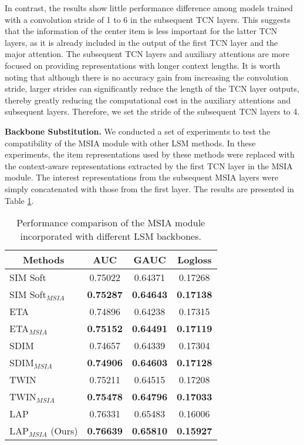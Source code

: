 In contrast, the results show little performance difference among models trained with a convolution stride of 1 to 6 in the subsequent TCN layers. This suggests that the information of the center item is less important for the latter TCN layers, as it is already included in the output of the first TCN layer and the major attention. The subsequent TCN layers and auxiliary attentions are more focused on providing representations with longer context lengths. It is worth noting that although there is no accuracy gain from increasing the convolution stride, larger strides can significantly reduce the length of the TCN layer outputs, thereby greatly reducing the computational cost in the auxiliary attentions and subsequent layers. Therefore, we set the stride of the subsequent TCN layers to 4. 

\textbf{Backbone Substitution.} We conducted a set of experiments to test the compatibility of the MSIA module with other LSM methods. In these experiments, the item representations used by these methods were replaced with the context-aware representations extracted by the first TCN layer in the MSIA module. The interest representations from the subsequent MSIA layers were simply concatenated with those from the first layer. The results are presented in Table \ref{tab:MSIA_LSMs}.
		
\begin{table}[t]
    \centering
    \caption{Performance comparison of the MSIA module incorporated with different LSM backbones.}
    \begin{tabular}{cccc}
    \toprule
     Methods & AUC & GAUC & Logloss \\
    \midrule
    \multicolumn{1}{l|}{SIM Soft} & 0.75022 & 0.64371 & 0.17268 \\
    \multicolumn{1}{l|}{SIM Soft$_{MSIA}$} & \textbf{0.75287} & \textbf{0.64643} & \textbf{0.17138} \\
    \midrule
    \multicolumn{1}{l|}{ETA} & 0.74896 & 0.64238 & 0.17315 \\
    \multicolumn{1}{l|}{ETA$_{MSIA}$} & \textbf{0.75152} & \textbf{0.64491} & \textbf{0.17119} \\
    \midrule
    \multicolumn{1}{l|}{SDIM} & 0.74657 & 0.64339 & 0.17304 \\
    \multicolumn{1}{l|}{SDIM$_{MSIA}$} & \textbf{0.74906} & \textbf{0.64603} & \textbf{0.17128} \\
    \midrule
    \multicolumn{1}{l|}{TWIN} & 0.75211	& 0.64515 & 0.17208 \\
    \multicolumn{1}{l|}{TWIN$_{MSIA}$} &  \textbf{0.75478} & \textbf{0.64796} & \textbf{0.17033} \\
    \midrule
    \multicolumn{1}{l|}{LAP} & 0.76331 & 0.65483 & 0.16006 \\
    \multicolumn{1}{l|}{LAP$_{MSIA}$ (Ours)} &  \textbf{0.76639} & \textbf{0.65810} & \textbf{0.15927} \\
    \bottomrule
    \end{tabular}
\label{tab:MSIA_LSMs}
\vspace{-0.4cm}
\end{table}		

